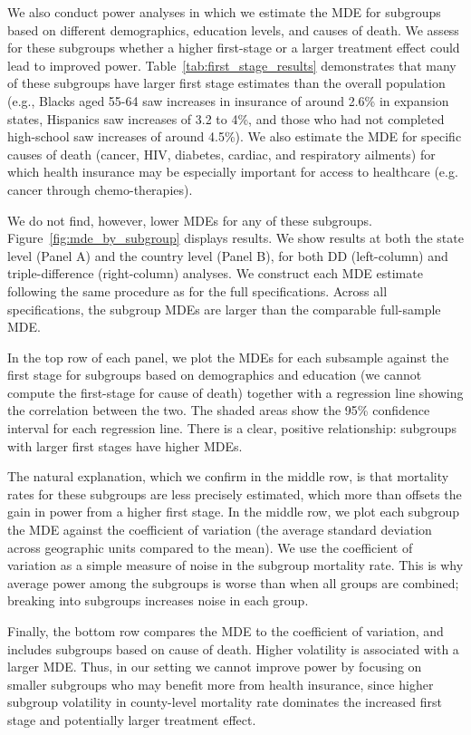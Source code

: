 \documentclass[12pt]{article}%
\begin{document}
We also conduct power analyses in which we estimate the MDE for subgroups based on different demographics, education levels, and causes of death.
We assess for these subgroups whether a higher first-stage or a larger treatment effect could lead to improved power. 
Table~\ref{tab:first_stage_results} demonstrates that many of these subgroups have larger first stage estimates than the overall population (e.g., Blacks aged 55-64 saw increases in insurance of around 2.6\% in expansion states, Hispanics saw increases of 3.2 to 4\%, and those who had not completed high-school saw increases of around 4.5\%).
We also estimate the MDE for specific causes of death (cancer, HIV, diabetes, cardiac, and respiratory ailments) for which health insurance may be especially important for access to healthcare (e.g. cancer through chemo-therapies). 

We do not find, however, lower MDEs for any of these subgroups.  
Figure~\ref{fig:mde_by_subgroup} displays results.  
We show results at both the state level (Panel A) and the country level (Panel B), for both DD (left-column) and triple-difference (right-column) analyses. 
We construct each MDE estimate following the same procedure as for the full specifications. 
Across all specifications, the subgroup MDEs are larger than the comparable full-sample MDE. 

In the top row of each panel, we plot the MDEs for each subsample against the first stage for subgroups based on demographics and education (we cannot compute the first-stage for cause of death) together with a regression line showing the correlation between the two. 
The shaded areas show the 95\% confidence interval for each regression line. 
There is a clear, positive relationship: subgroups with larger first stages have higher MDEs. 

The natural explanation, which we confirm in the middle row, is that mortality rates for these subgroups are less precisely estimated, which more than offsets the gain in power from a higher first stage.  
In the middle row, we plot each subgroup the MDE against the coefficient of variation (the average standard deviation across geographic units compared to the mean).  
We use the coefficient of variation as a simple measure of noise in the subgroup mortality rate. 
This is why average power among the subgroups is worse than when all groups are combined; breaking into subgroups increases noise in each group. 


Finally, the bottom row compares the MDE to the coefficient of variation, and includes subgroups based on cause of death. 
Higher volatility is associated with a larger MDE. 
Thus, in our setting we cannot improve power by focusing on smaller subgroups who may benefit more from health insurance, since higher subgroup volatility in county-level mortality rate dominates the increased first stage and potentially larger treatment effect. 
\end{document}
